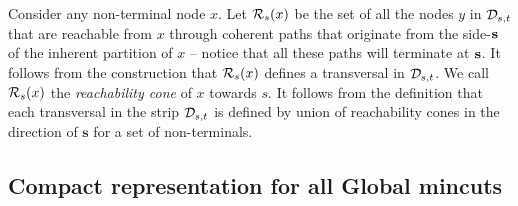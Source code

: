 

Consider any non-terminal node $x$. Let ${\cal R}_s(x)$ be the set of all the nodes $y$ in ${\cal D}_{s,t}$ that are reachable from $x$ through coherent paths that originate from the side-${\bf s}$ of the inherent partition of $x$ -- notice that all these paths will terminate at ${\bf s}$. 
It follows from the construction that ${\cal R}_s(x)$ defines a transversal in
${\cal D}_{s,t}$. We call ${\cal R}_s(x)$ the \textit{reachability cone} of $x$ towards $s$. It follows from the definition that each transversal in the strip ${\cal D}_{s,t}$ is defined by union of reachability cones in the direction of ${\mathbf s}$ for a set of non-terminals.

\subsection{Compact representation for all Global mincuts}




